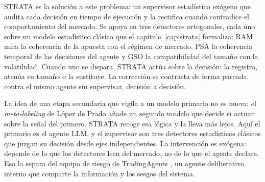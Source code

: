 STRATA es la solución a este problema: un supervisor estadístico exógeno que audita cada decisión en tiempo de ejecución y la rectifica cuando contradice el comportamiento del mercado. Se apoya en tres detectores ortogonales, cada uno sobre un modelo estadístico clásico que el capítulo~\ref{cap:strata} formaliza: RAM mira la coherencia de la apuesta con el régimen de mercado, PSA la coherencia temporal de las decisiones del agente y GSO la compatibilidad del tamaño con la volatilidad. Cuando uno se dispara, STRATA actúa sobre la decisión: la registra, atenúa su tamaño o la sustituye. La corrección se contrasta de forma pareada contra el mismo agente sin supervisar, decisión a decisión.

La idea de una etapa secundaria que vigila a un modelo primario no es nueva: el \emph{meta-labeling} de López de Prado \cite{lopezdeprado2018} añade un segundo modelo que decide si actuar sobre la señal del primero. STRATA recoge esa lógica y la lleva más lejos. Aquí el primario es el agente LLM, y el supervisor son tres detectores estadísticos clásicos que juzgan su decisión desde ejes independientes. La intervención es exógena: depende de lo que los detectores leen del mercado, no de lo que el agente declare. Eso la separa del equipo de riesgo de TradingAgents \cite{xiao2024tradingagents}, un agente deliberativo interno que comparte la información y los sesgos del sistema.

